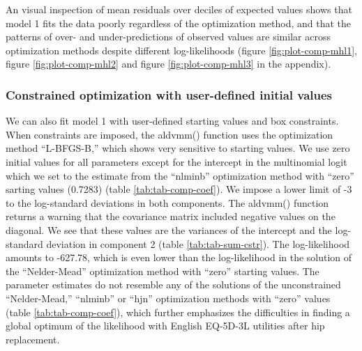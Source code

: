 \documentclass[
]{article}
\begin{document}
An visual inspection of mean residuals over deciles of expected values shows that model 1 fits the data poorly regardless of the optimization method, and that the patterns of over- and under-predictions of observed values are similar across optimization methods despite different log-likelihoods (figure \ref{fig:plot-comp-mhl1}, figure \ref{fig:plot-comp-mhl2} and figure \ref{fig:plot-comp-mhl3} in the appendix).

\hypertarget{constrained-optimization-with-user-defined-initial-values}{%
\subsubsection{Constrained optimization with user-defined initial values}\label{constrained-optimization-with-user-defined-initial-values}}

We can also fit model 1 with user-defined starting values and box constraints. When constraints are imposed, the aldvmm() function uses the optimization method ``L-BFGS-B,'' which shows very sensitive to starting values. We use zero initial values for all parameters except for the intercept in the multinomial logit which we set to the estimate from the ``nlminb'' optimization method with ``zero'' sarting values (0.7283) (table \ref{tab:tab-comp-coef}). We impose a lower limit of -3 to the log-standard deviations in both components. The aldvmm() function returns a warning that the covariance matrix included negative values on the diagonal. We see that these values are the variances of the intercept and the log-standard deviation in component 2 (table \ref{tab:tab-sum-cstr}). The log-likelihood amounts to -627.78, which is even lower than the log-likelihood in the solution of the ``Nelder-Mead'' optimization method with ``zero'' starting values. The parameter estimates do not resemble any of the solutions of the unconstrained ``Nelder-Mead,'' ``nlminb'' or ``hjn'' optimization methods with ``zero'' values (table \ref{tab:tab-comp-coef}), which further emphasizes the difficulties in finding a global optimum of the likelihood with English EQ-5D-3L utilities after hip replacement.
\end{document}
